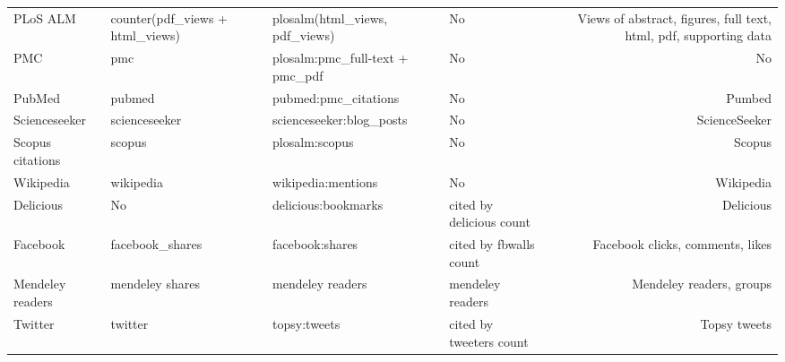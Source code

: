 \documentclass[letterpaper,superscriptaddress,showkeys,longbibliography]{revtex4-1}\usepackage{graphicx, color}
\begin{document}
\begin{table}[!ht]
\begin{threeparttable}[b]
\begin{tabular}[t]{|B|B|B|B|D|}
PLoS ALM & counter(pdf\_views + html\_views) & plosalm(html\_views, pdf\_views) & No & Views of abstract, figures, full text, html, pdf, supporting data \\
PMC & pmc & plosalm:pmc\_full-text + pmc\_pdf & No & No \\
PubMed & pubmed & pubmed:pmc\_citations & No & Pumbed \\
Scienceseeker & scienceseeker & scienceseeker:blog\_posts & No & ScienceSeeker \\
Scopus citations & scopus & plosalm:scopus & No & Scopus \\
Wikipedia & wikipedia & wikipedia:mentions & No & Wikipedia \\
Delicious & No & delicious:bookmarks & cited by delicious count & Delicious \\
Facebook & facebook\_shares & facebook:shares & cited by fbwalls count & Facebook clicks, comments, likes \\
Mendeley readers & mendeley shares & mendeley readers & mendeley readers & Mendeley readers, groups \\
Twitter & twitter & topsy:tweets & cited by tweeters count & Topsy tweets \\
\hline
\end{tabular}
\end{threeparttable}
\end{table}
\end{document}
